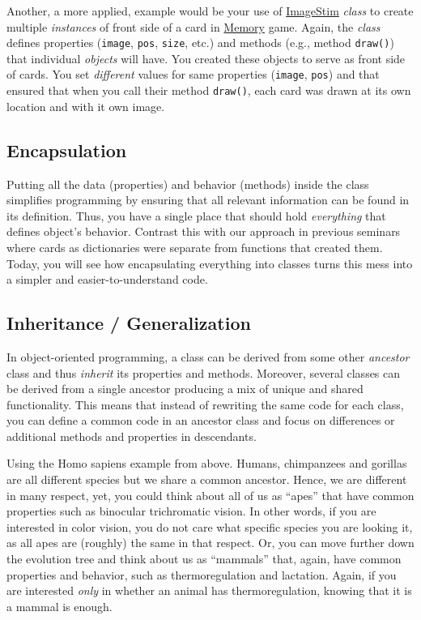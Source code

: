 \documentclass[
]{book}
\begin{document}
Another, a more applied, example would be your use of \href{https://psychopy.org/api/visual/imagestim.html\#psychopy.visual.ImageStim}{ImageStim} \emph{class} to create multiple \emph{instances} of front side of a card in \href{memory-game}{Memory} game. Again, the \emph{class} defines properties (\texttt{image}, \texttt{pos}, \texttt{size}, etc.) and methods (e.g., method \texttt{draw()}) that individual \emph{objects} will have. You created these objects to serve as front side of cards. You set \emph{different} values for same properties (\texttt{image}, \texttt{pos}) and that ensured that when you call their method \texttt{draw()}, each card was drawn at its own location and with it own image.

\hypertarget{encapsulation}{%
\subsection{Encapsulation}\label{encapsulation}}

Putting all the data (properties) and behavior (methods) inside the class simplifies programming by ensuring that all relevant information can be found in its definition. Thus, you have a single place that should hold \emph{everything} that defines object's behavior. Contrast this with our approach in previous seminars where cards as dictionaries were separate from functions that created them. Today, you will see how encapsulating everything into classes turns this mess into a simpler and easier-to-understand code.

\hypertarget{inheritance-generalization}{%
\subsection{Inheritance / Generalization}\label{inheritance-generalization}}

In object-oriented programming, a class can be derived from some other \emph{ancestor} class and thus \emph{inherit} its properties and methods. Moreover, several classes can be derived from a single ancestor producing a mix of unique and shared functionality. This means that instead of rewriting the same code for each class, you can define a common code in an ancestor class and focus on differences or additional methods and properties in descendants.

Using the Homo sapiens example from above. Humans, chimpanzees and gorillas are all different species but we share a common ancestor. Hence, we are different in many respect, yet, you could think about all of us as ``apes'' that have common properties such as binocular trichromatic vision. In other words, if you are interested in color vision, you do not care what specific species you are looking it, as all apes are (roughly) the same in that respect. Or, you can move further down the evolution tree and think about us as ``mammals'' that, again, have common properties and behavior, such as thermoregulation and lactation. Again, if you are interested \emph{only} in whether an animal has thermoregulation, knowing that it is a mammal is enough.
\end{document}
